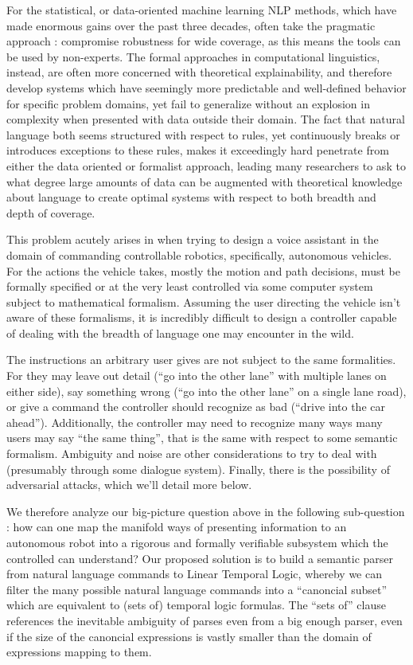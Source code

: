 \documentclass[a4paper, 11pt]{article}
\begin{document}
For the statistical, or data-oriented machine learning NLP methods, which have
made enormous gains over the past three decades, often take the pragmatic
approach : compromise robustness for wide coverage, as this means the tools can
be used by non-experts. The formal approaches in computational linguistics,
instead, are often more concerned with theoretical explainability, and therefore
develop systems which have seemingly more predictable and well-defined behavior
for specific problem domains, yet fail to generalize without an explosion in
complexity when presented with data outside their domain. The fact that natural
language both seems structured with respect to rules, yet continuously breaks or
introduces exceptions to these rules, makes it exceedingly hard penetrate from
either the data oriented or formalist approach, leading many researchers to ask
to what degree large amounts of data can be augmented with theoretical knowledge
about language to create optimal systems with respect to both breadth and depth
of coverage.

This problem acutely arises in when trying to design a voice assistant in the
domain of commanding controllable robotics, specifically, autonomous vehicles.
For the actions the vehicle takes, mostly the motion and path decisions, must be
formally specified or at the very least controlled via some computer system
subject to mathematical formalism. Assuming the user directing the vehicle isn't
aware of these formalisms, it is incredibly difficult to design a controller
capable of dealing with the breadth of language one may encounter in the wild.

The instructions an arbitrary user gives are not subject to the same
formalities. For they may leave out detail (``go into the other lane'' with
multiple lanes on either side), say something wrong (``go into the other lane''
on a single lane road), or give a command the controller should recognize as bad
(``drive into the car ahead''). Additionally, the controller may need to
recognize many ways many users may say ``the same thing'', that is the same with
respect to some semantic formalism. Ambiguity and noise are other considerations
to try to deal with (presumably through some dialogue system). Finally, there is
the possibility of adversarial attacks, which we'll detail more below.

We therefore analyze our big-picture question above in the following
sub-question : how can one map the manifold ways of presenting information to an
autonomous robot into a rigorous and formally verifiable subsystem which the
controlled can understand? Our proposed solution is to build a semantic parser
from natural language commands to Linear Temporal Logic, whereby we can filter
the many possible natural language commands into a ``canoncial subset'' which
are equivalent to (sets of) temporal logic formulas. The ``sets of'' clause
references the inevitable ambiguity of parses even from a big enough parser, even
if the size of the canoncial expressions is vastly smaller than the domain of
expressions mapping to them.
\end{document}
